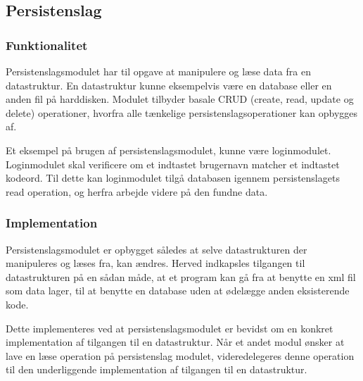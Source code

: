 \subsection{Persistenslag}
\label{sub:persistenslag}

\subsubsection{Funktionalitet}
\label{ssub:persistenslag_funktionalitet}

Persistenslagsmodulet har til opgave at manipulere og læse data fra en datastruktur. En datastruktur kunne eksempelvis være en database eller en anden fil på harddisken. Modulet tilbyder basale CRUD (create, read, update og delete) operationer, hvorfra alle tænkelige persistenslagsoperationer kan opbygges af.

Et eksempel på brugen af persistenslagsmodulet, kunne være loginmodulet. Loginmodulet skal verificere om et indtastet brugernavn matcher et indtastet kodeord. Til dette kan loginmodulet tilgå databasen igennem persistenslagets read operation, og herfra arbejde videre på den fundne data.


\subsubsection{Implementation}
\label{ssub:persistenslag_implementation}


Persistenslagsmodulet er opbygget således at selve datastrukturen der manipuleres og læses fra, kan ændres. Herved indkapsles tilgangen til datastrukturen på en sådan måde, at et program kan gå fra at benytte en xml fil som data lager, til at benytte en database uden at ødelægge anden eksisterende kode.

Dette implementeres ved at persistenslagsmodulet er bevidst om en konkret implementation af tilgangen til en datastruktur. Når et andet modul ønsker at lave en læse operation på persistenslag modulet, videredelegeres denne operation til den underliggende implementation af tilgangen til en datastruktur.
